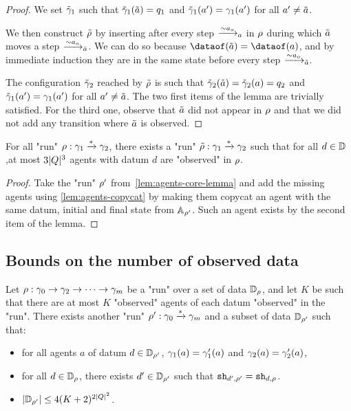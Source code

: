 \begin{proof}
	We set $\Tilde{\config}_1$ such that $\Tilde{\config}_1(\Tilde{a}) = q_1$ and $\Tilde{\config}_1(a') = \config_1(a')$ for all $a' \neq \Tilde{a}$.
	
	We then construct $\Tilde{\run}$ by inserting after every step $\step{\sim}{a}{a_o}$ in $\run$ during which $\Tilde{a}$ moves a step
	$\step{\sim}{\Tilde{a}}{a_o}$.
	We can do so because $\dataof(\Tilde{a})=\dataof(a)$, and by immediate induction they are in the same state before every step $\step{\sim}{\Tilde{a}}{a_o}$.
	
	The configuration $\Tilde{\config}_2$ reached by $\Tilde{\run}$ is such that $\Tilde{\config}_2(\Tilde{a}) = \Tilde{\config}_2(a) = q_2$ and $\Tilde{\config}_1(a') = \config_1(a')$ for all $a' \neq \Tilde{a}$. The two first items of the lemma are trivially satisfied.
	For the third one, observe that $\Tilde{a}$ did not appear in $\run$ and that we did not add any transition where $\Tilde{a}$ is observed.
\end{proof}


\begin{corollary}
	For all "run" $\run : \config_1 \xrightarrow{*} \config_2$, there exists a "run" $\Tilde{\run} : \config_1 \xrightarrow{*} \config_2$ such that for all $d \in \Dataset$,at most $3\size{Q}^3$ agents with datum $d$ are "observed" in $\run$.
\end{corollary}

\begin{proof}
	Take the "run" $\run'$ from~\cref{lem:agents-core-lemma} and add the missing agents using \cref{lem:agents-copycat} by making them copycat an agent with the same datum, initial and final state from $\Agentset_{\run'}$. Such an agent exists by the second item of the lemma.
\end{proof}

\subsection{Bounds on the number of observed data}

\begin{lemma}
	\label{lem:data-core-lemma}
	Let $\run : \config_0 \to \config_2 \to \cdots \to \config_m$ be a "run"  over a set of data $\Dataset_{\run}$, and let $K$ be such that there are at most $K$ "observed" agents of each datum "observed" in the "run". There exists another "run" $\run' : \config_0 \xrightarrow{*} \config_m$ and a subset of data $\Dataset_{\run'}$ such that:
	\begin{itemize}
		\item for all agents $a$ of datum $d \in \Dataset_{\run'}$, $\config_1(a) = \config'_1(a)$ and $\config_2(a) = \config'_2(a)$,
		
		\item for all $d \in \Dataset_{\run}$, there exists $d' \in \Dataset_{\run'}$ such that $\shadow{d'}{\run'} = \shadow{d}{\run}$.
		
		\item $\size{\Dataset_{\run'}} \leq 4(K+2)^{2\size{Q}^2}$.
	\end{itemize}
\end{lemma}


